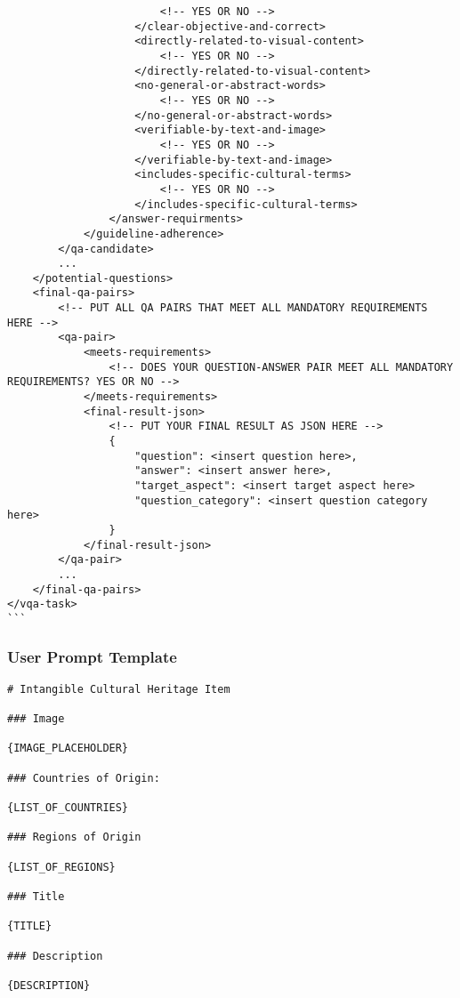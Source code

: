 \begin{tcolorbox}[
    enhanced, 
    breakable,
    skin first=enhanced,
    skin middle=enhanced,
    skin last=enhanced,
]
\begin{verbatim}
                        <!-- YES OR NO -->
                    </clear-objective-and-correct>
                    <directly-related-to-visual-content>
                        <!-- YES OR NO -->
                    </directly-related-to-visual-content>
                    <no-general-or-abstract-words>
                        <!-- YES OR NO -->
                    </no-general-or-abstract-words>
                    <verifiable-by-text-and-image>
                        <!-- YES OR NO -->
                    </verifiable-by-text-and-image>
                    <includes-specific-cultural-terms>
                        <!-- YES OR NO -->
                    </includes-specific-cultural-terms>
                </answer-requirments>
            </guideline-adherence>
        </qa-candidate>
        ...
    </potential-questions>
    <final-qa-pairs>
        <!-- PUT ALL QA PAIRS THAT MEET ALL MANDATORY REQUIREMENTS HERE -->
        <qa-pair>
            <meets-requirements>
                <!-- DOES YOUR QUESTION-ANSWER PAIR MEET ALL MANDATORY REQUIREMENTS? YES OR NO -->
            </meets-requirements>
            <final-result-json>
                <!-- PUT YOUR FINAL RESULT AS JSON HERE -->
                {
                    "question": <insert question here>,
                    "answer": <insert answer here>,
                    "target_aspect": <insert target aspect here>
                    "question_category": <insert question category here>
                }
            </final-result-json>
        </qa-pair>
        ...
    </final-qa-pairs>
</vqa-task>
```
\end{verbatim}
\end{tcolorbox}
%
\subsubsection{User Prompt Template}
\label{appendix:sec:sivqa:synth:usr_prompt}
%

\begin{tcolorbox}[
    enhanced, 
    breakable,
    skin first=enhanced,
    skin middle=enhanced,
    skin last=enhanced,
]
\begin{verbatim}
# Intangible Cultural Heritage Item

### Image

{IMAGE_PLACEHOLDER}

### Countries of Origin:

{LIST_OF_COUNTRIES}

### Regions of Origin

{LIST_OF_REGIONS}

### Title

{TITLE}

### Description

{DESCRIPTION}

\end{verbatim}
\end{tcolorbox}

%
\twocolumn

